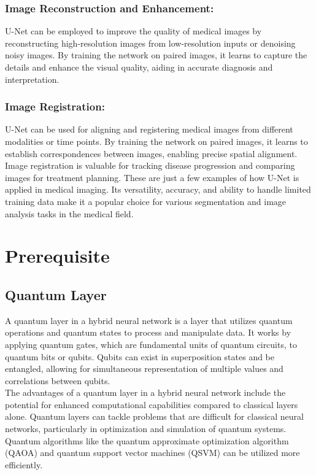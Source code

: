 \documentclass[conference]{IEEEtran}
\begin{document}
 \subsubsection{Image Reconstruction and Enhancement:}
 U-Net can be employed to improve the quality of medical images by reconstructing high-resolution images from low-resolution inputs or denoising noisy images. By training the network on paired images, it learns to capture the details and enhance the visual quality, aiding in accurate diagnosis and interpretation.
 \subsubsection{Image Registration:}
 U-Net can be used for aligning and registering medical images from different modalities or time points. By training the network on paired images, it learns to establish correspondences between images, enabling precise spatial alignment. Image registration is valuable for tracking disease progression and comparing images for treatment planning.
These are just a few examples of how U-Net is applied in medical imaging. Its versatility, accuracy, and ability to handle limited training data make it a popular choice for various segmentation and image analysis tasks in the medical field.
\section{Prerequisite}
\subsection{Quantum Layer}
A quantum layer in a hybrid neural network is a layer that utilizes quantum operations and quantum states to process and manipulate data. It works by applying quantum gates, which are fundamental units of quantum circuits, to quantum bits or qubits. Qubits can exist in superposition states and be entangled, allowing for simultaneous representation of multiple values and correlations between qubits.\\

The advantages of a quantum layer in a hybrid neural network include the potential for enhanced computational capabilities compared to classical layers alone. Quantum layers can tackle problems that are difficult for classical neural networks, particularly in optimization and simulation of quantum systems. Quantum algorithms like the quantum approximate optimization algorithm (QAOA) and quantum support vector machines (QSVM) can be utilized more efficiently.\\
\end{document}
